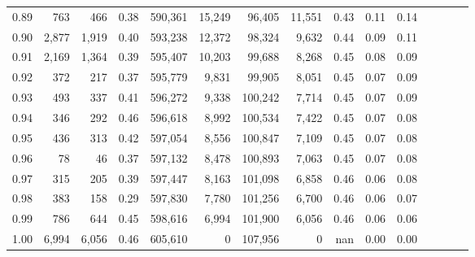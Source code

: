\begin{tabular}{rrrcrrrrrrrrrrr}
0.89 &     763 &    466 &                                       0.38 &  590,361 &   15,249 &   96,405 &   11,551 &  0.43 &  0.11 &                         0.14 \\
0.90 &   2,877 &  1,919 &                                       0.40 &  593,238 &   12,372 &   98,324 &    9,632 &  0.44 &  0.09 &                         0.11 \\
0.91 &   2,169 &  1,364 &                                       0.39 &  595,407 &   10,203 &   99,688 &    8,268 &  0.45 &  0.08 &                         0.09 \\
0.92 &     372 &    217 &                                       0.37 &  595,779 &    9,831 &   99,905 &    8,051 &  0.45 &  0.07 &                         0.09 \\
0.93 &     493 &    337 &                                       0.41 &  596,272 &    9,338 &  100,242 &    7,714 &  0.45 &  0.07 &                         0.09 \\
0.94 &     346 &    292 &                                       0.46 &  596,618 &    8,992 &  100,534 &    7,422 &  0.45 &  0.07 &                         0.08 \\
0.95 &     436 &    313 &                                       0.42 &  597,054 &    8,556 &  100,847 &    7,109 &  0.45 &  0.07 &                         0.08 \\
0.96 &      78 &     46 &                                       0.37 &  597,132 &    8,478 &  100,893 &    7,063 &  0.45 &  0.07 &                         0.08 \\
0.97 &     315 &    205 &                                       0.39 &  597,447 &    8,163 &  101,098 &    6,858 &  0.46 &  0.06 &                         0.08 \\
0.98 &     383 &    158 &                                       0.29 &  597,830 &    7,780 &  101,256 &    6,700 &  0.46 &  0.06 &                         0.07 \\
0.99 &     786 &    644 &                                       0.45 &  598,616 &    6,994 &  101,900 &    6,056 &  0.46 &  0.06 &                         0.06 \\
1.00 &   6,994 &  6,056 &                                       0.46 &  605,610 &        0 &  107,956 &        0 &   nan &  0.00 &                         0.00 \\
\bottomrule
\end{tabular}
